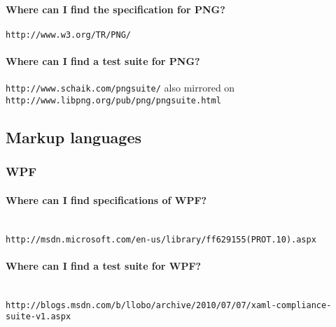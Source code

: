 \documentclass[10pt]{scrbook}
\begin{document}
\paragraph{Where can I find the specification for PNG?} \verb|http://www.w3.org/TR/PNG/|

\paragraph{Where can I find a test suite for PNG?} \verb|http://www.schaik.com/pngsuite/| also mirrored on \verb|http://www.libpng.org/pub/png/pngsuite.html|

\subsection{Markup languages}

\subsubsection{WPF}

\paragraph{Where can I find specifications of WPF?} ~ \\
\verb|http://msdn.microsoft.com/en-us/library/ff629155(PROT.10).aspx|

\paragraph{Where can I find a test suite for WPF?} ~ \\
\verb|http://blogs.msdn.com/b/llobo/archive/2010/07/07/xaml-compliance-suite-v1.aspx|
\end{document}
